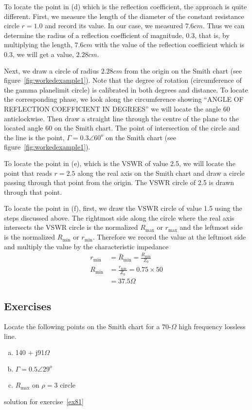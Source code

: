 \begin{exmp}
To locate the point in (d) which is the reflection coefficient, the approach is quite different. First, we measure the length of the diameter of the constant resistance circle $r = 1.0$ and record its value. In our case, we measured $7.6cm$. Thus we can determine the radius of a reflection coefficient of magnitude, $0.3$, that is, by multiplying the length, $7.6cm$ with the value of the reflection coefficient which is $0.3$, we will get a value, $2.28cm$. 

Next, we draw a circle of radius $2.28cm$ from the origin on the Smith chart (see figure~\ref{fig:workedexample1}). Note that the degree of rotation (circumference of the gamma plane\textemdash limit circle) is calibrated in both degrees and distance. To locate the corresponding phase, we look along the circumference showing \textquotedblleft ANGLE OF REFLECTION COEFFICIENT IN DEGREES\textquotedblright\; we will locate the angle 60\textdegree\; anticlockwise. Then draw a straight line through the centre of the plane to the located angle 60\textdegree\; on the Smith chart. The point of intersection of the circle and the line is the point, $\Gamma = 0.3\angle60^o$ on the Smith chart (see figure~\ref{fig:workedexample1}).

To locate the point in (e), which is the VSWR of value 2.5, we will locate the point that reads $r = 2.5$ along the real axis on the Smith chart and draw a circle passing through that point from the origin. The VSWR circle of 2.5 is drawn through that point.

To locate the point in (f), first, we draw the VSWR circle of value 1.5 using the steps discussed above. The rightmost side along the circle where the real axis intersects the VSWR circle is the normalized $R_\max$ or $r_\max$ and the leftmost side is the normalized $R_\min$ or $r_\min$. Therefore we record the value at the leftmost side and multiply the value by the characteristic impedance
\begin{align*}
r_\min &= \bar{R}_\min = \frac{R_\min}{Z_0}\\
R_\min &= \frac{r_\min}{Z_0} = 0.75 \times 50\\
&= 37.5\Omega
\end{align*}
\end{exmp}

\begin{mdframed}[ backgroundcolor=lightblue, linewidth=1pt, hidealllines=true]
\section*{Exercises}
\begin{ExerciseList}
\Exercise[label={ex81}] Locate the following points on the Smith chart for a 70-$\varOmega$ high frequency lossless line.
\begin{enumerate}[(a)]
\item 140 + j91$\varOmega$
\item $\Gamma=0.5\angle29^o$
\item $R_\max$ on $\rho = 3$ circle
\end{enumerate}
\Answer[ref={ex81}]
solution for exercise~\ref{ex81}
\end{ExerciseList}
\end{mdframed}